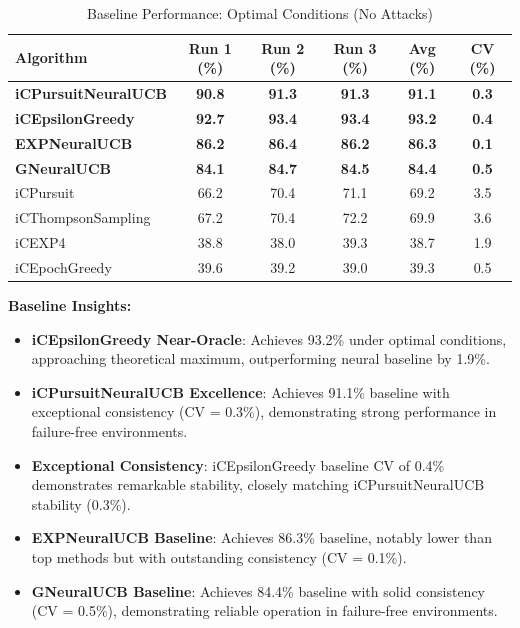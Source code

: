 \documentclass[12pt,a4paper]{article}
\newcommand{\primarytext}[1]{\textcolor{primaryblue}{\textbf{#1}}}
\newcommand{\legacy}[1]{\textcolor{legacycolor}{\textbf{#1}}}
\newcommand{\neural}[1]{\textcolor{neuralcolor}{\textbf{#1}}}
\begin{document}
\begin{table}[H]
\centering
\caption{Baseline Performance: Optimal Conditions (No Attacks)}
\label{tab:baseline-performance}
\begin{tabular}{@{}lccccc@{}}\toprule
\textbf{Algorithm} & \textbf{Run 1 (\%)} & \textbf{Run 2 (\%)} & \textbf{Run 3 (\%)} & \textbf{Avg (\%)} & \textbf{CV (\%)} \\\midrule
\neural{iCPursuitNeuralUCB}   & \neural{90.8} & \neural{91.3} & \neural{91.3} & \neural{91.1} & \neural{0.3} \\
\primarytext{iCEpsilonGreedy}   & \primarytext{92.7} & \primarytext{93.4} & \primarytext{93.4} & \primarytext{93.2} & \primarytext{0.4} \\
\legacy{EXPNeuralUCB}           & \legacy{86.2} & \legacy{86.4} & \legacy{86.2} & \legacy{86.3} & \legacy{0.1} \\
\neural{GNeuralUCB}            & \neural{84.1} & \neural{84.7} & \neural{84.5} & \neural{84.4} & \neural{0.5} \\
iCPursuit                       & 66.2 & 70.4 & 71.1 & 69.2 & 3.5 \\
iCThompsonSampling              & 67.2 & 70.4 & 72.2 & 69.9 & 3.6 \\
iCEXP4                          & 38.8 & 38.0 & 39.3 & 38.7 & 1.9 \\
iCEpochGreedy                   & 39.6 & 39.2 & 39.0 & 39.3 & 0.5 \\\bottomrule
\end{tabular}
\end{table}

\textbf{Baseline Insights:}
\begin{itemize}
\item \primarytext{iCEpsilonGreedy Near-Oracle}: Achieves 93.2\% under optimal conditions, approaching theoretical maximum, outperforming neural baseline by 1.9\%.
\item \neural{iCPursuitNeuralUCB Excellence}: Achieves 91.1\% baseline with exceptional consistency (CV = 0.3\%), demonstrating strong performance in failure-free environments.
\item \primarytext{Exceptional Consistency}: iCEpsilonGreedy baseline CV of 0.4\% demonstrates remarkable stability, closely matching iCPursuitNeuralUCB stability (0.3\%).
\item \legacy{EXPNeuralUCB Baseline}: Achieves 86.3\% baseline, notably lower than top methods but with outstanding consistency (CV = 0.1\%).
\item \neural{GNeuralUCB Baseline}: Achieves 84.4\% baseline with solid consistency (CV = 0.5\%), demonstrating reliable operation in failure-free environments.
\end{itemize}
\end{document}
